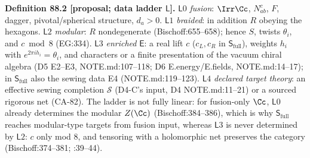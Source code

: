 \textbf{Definition 88.2 [proposal; data ladder \(\mathsf L\)].}
\(\mathsf L0\) \emph{fusion}: \(\Irr\Cc\), \(N_{ab}^c\), \(F\), dagger, pivotal/spherical structure, \(d_a>0\).
\(\mathsf L1\) \emph{braided}: in addition \(R\) obeying the hexagons.
\(\mathsf L2\) \emph{modular}: \(R\) nondegenerate (Bischoff:655--658); hence \(S\), twists \(\theta_i\), and \(c\bmod 8\) (EG:334).
\(\mathsf L3\) \emph{enriched} \(\mathsf E\): a real lift \(c\) (\(c_L,c_R\) in \(\mathsf S_{\mathrm{full}}\)), weights \(h_i\) with
\(e^{2\pi ih_i}=\theta_i\), and characters or a finite presentation of the vacuum chiral algebra (D5 E2--E3,
NOTE.md:107--118; D6 E.energy/E.fields, NOTE.md:14--17); in \(\mathsf S_{\mathrm{full}}\) also the sewing data E4
(NOTE.md:119--123).  \(\mathsf L4\) \emph{declared target theory}: an effective sewing completion \(\mathcal S\) (D4-C's input,
D4 NOTE.md:11--21) or a sourced rigorous net (CA-82).
The ladder is not fully linear: for fusion-only \(\Cc\), \(\mathsf L0\) already determines the modular \(Z(\Cc)\)
(Bischoff:384--386), which is why \(\mathsf S_{\mathrm{full}}\) reaches modular-type targets from fusion input, whereas
\(\mathsf L3\) is never determined by \(\mathsf L2\): \(c\) only mod 8, and tensoring with a holomorphic net preserves the
category (Bischoff:374--381; :39--44).

